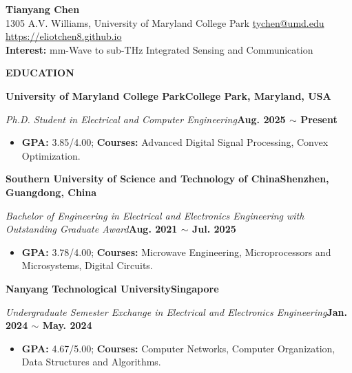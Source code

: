 \documentclass[10pt, letterpaper]{article}
\newcommand{\resumesection}[1]{
  \vspace{0.75em}
  \begin{mdframed}[style=sectionstyle]
    \textbf{#1}
  \end{mdframed}
  \vspace{0.75em}
}
\newcommand{\cventry}[5]{ 
  \vspace{0em}
    \textbf{#1}\hfill\textbf{#2}
    \par
    \textit{#3}\hfill\textbf{#4}
    \par
  #5
  \vspace{0em}
}
\newenvironment{cvlist}{%
  \vspace{0em}
  \begin{itemize}[leftmargin=1em, itemsep=0em, topsep=0em, parsep=0em]}{
  \end{itemize}
  \vspace{0.5em}
}
\begin{document}

\begin{minipage}[t]{0.8\linewidth}
  {\LARGE\textbf{Tianyang Chen}}
  \\[0.5em]
  1305 A.V. Williams, University of Maryland College Park 
  \textbar{} \href{mailto:tychen@umd.edu}{tychen@umd.edu} 
  \textbar{} \href{https://eliotchen8.github.io}{https://eliotchen8.github.io}
  \\[0em]
  \textbf{Interest:} mm-Wave to sub-THz Integrated Sensing and Communication
\end{minipage}%
\hfill
\begin{minipage}[t]{0.2\linewidth}
  \raggedleft
  \vspace{-1.25em}
\end{minipage}


\resumesection{EDUCATION}

\cventry
{University of Maryland College Park}
{College Park, Maryland, USA}
{Ph.D. Student in Electrical and Computer Engineering}
{Aug. 2025 $\sim$ Present}
{
  \begin{cvlist}
    \item 
    \textbf{GPA:} 3.85/4.00; 
    \textbf{Courses:} Advanced Digital Signal Processing, Convex Optimization.
  \end{cvlist}
}

\cventry
{Southern University of Science and Technology of China}
{Shenzhen, Guangdong, China}
{Bachelor of Engineering in Electrical and Electronics Engineering with Outstanding Graduate Award}
{Aug. 2021 $\sim$ Jul. 2025}
{
  \begin{cvlist}
    \item 
    \textbf{GPA:} 3.78/4.00; 
    \textbf{Courses:} Microwave Engineering, Microprocessors and Microsystems, Digital Circuits.
  \end{cvlist}
}

\cventry
{Nanyang Technological University}
{Singapore}
{Undergraduate Semester Exchange in Electrical and Electronics Engineering}
{Jan. 2024 $\sim$ May. 2024}
{
  \begin{cvlist}
    \item 
    \textbf{GPA:} 4.67/5.00; 
    \textbf{Courses:} Computer Networks, Computer Organization, Data Structures and Algorithms.
  \end{cvlist}
}
\end{document}
